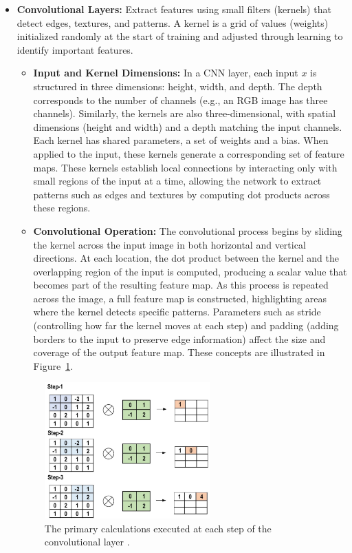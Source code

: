 \begin{itemize}
    \item \textbf{Convolutional Layers:} Extract features using small filters (kernels) that detect edges, textures, and patterns. A kernel is a grid of values (weights) initialized randomly at the start of training and adjusted through learning to identify important features.
     
     
    \begin{itemize}
        \item \textbf{Input and Kernel Dimensions:} In a CNN layer, each input $x$ is structured in three dimensions: height, width, and depth. The depth corresponds to the number of channels (e.g., an RGB image has three channels). Similarly, the kernels are also three-dimensional, with spatial dimensions (height and width) and a depth matching the input channels. Each kernel has shared parameters, a set of weights and a bias. When applied to the input, these kernels generate a corresponding set of feature maps. These kernels establish local connections by interacting only with small regions of the input at a time, allowing the network to extract patterns such as edges and textures by computing dot products across these regions.
        \item \textbf{Convolutional Operation:} The convolutional process begins by sliding the kernel across the input image in both horizontal and vertical directions. At each location, the dot product between the kernel and the overlapping region of the input is computed, producing a scalar value that becomes part of the resulting feature map. As this process is repeated across the image, a full feature map is constructed, highlighting areas where the kernel detects specific patterns. Parameters such as stride (controlling how far the kernel moves at each step) and padding (adding borders to the input to preserve edge information) affect the size and coverage of the output feature map. These concepts are illustrated in Figure~\ref{fig:figure05}.
     \end{itemize}   
    
     
    
    \begin{figure}[H] %
        \centering
        \includegraphics[width=0.6\textwidth]{chapters/chapter1/images/Figure05.png}
        \caption{The primary calculations executed at each step of the convolutional layer \parencite{alzubaidi2021review}.}
        \label{fig:figure05}
    \end{figure}


\end{itemize}
